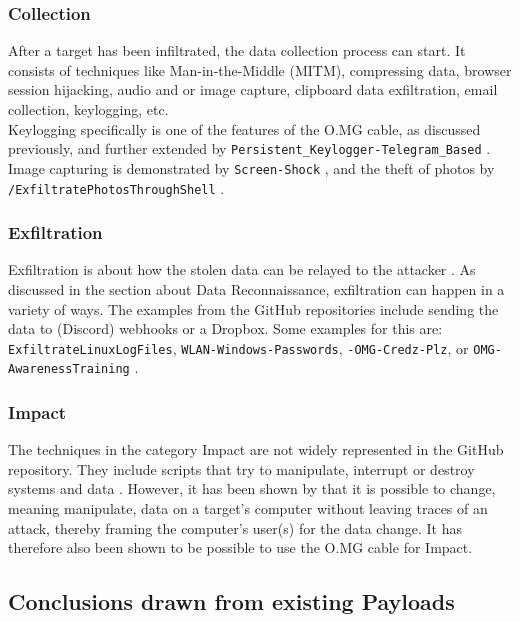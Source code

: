 \subsubsection{Collection}
After a target has been infiltrated, the data collection process can start. It consists of techniques like Man-in-the-Middle (MITM), compressing data, browser session hijacking, audio and or image capture, clipboard data exfiltration, email collection, keylogging, etc. \cite{MITREATTCK} \\
Keylogging specifically is one of the features of the O.MG cable, as discussed previously, and further extended by \verb|Persistent_Keylogger-Telegram_Based|
\cite{OmgpayloadsPayloadsLibrary}. Image capturing is demonstrated by \verb|Screen-Shock| \cite{OmgpayloadsPayloadsLibrary}, and the theft of photos by \verb|/ExfiltratePhotosThroughShell| \cite{OmgpayloadsPayloadsLibrary}.


\subsubsection{Exfiltration}

Exfiltration is about how the stolen data can be relayed to the attacker \cite{MITREATTCK}. As discussed in the section about Data Reconnaissance,
exfiltration can happen in a variety of ways. The examples from the GitHub repositories include sending the data to (Discord) webhooks or a
Dropbox. Some examples for this are:  \verb|ExfiltrateLinuxLogFiles|, \verb|WLAN-Windows-Passwords|, \verb|-OMG-Credz-Plz|, or \verb|OMG-AwarenessTraining|  \cite{OmgpayloadsPayloadsLibrary}.

\subsubsection{Impact}

The techniques in the category Impact are not widely represented in the GitHub repository. They include scripts that try to manipulate, interrupt or destroy systems and data \cite{MITREATTCK}.
However, it has been shown by \cite{lawalFacilitatingCyberenabledFraud2022} that it is possible to change, meaning manipulate, data on a target's
computer without leaving traces of an attack, thereby framing the computer's user(s) for the data change. It has therefore also been shown to be possible to use the O.MG cable for Impact.

\subsection{Conclusions drawn from existing Payloads}

